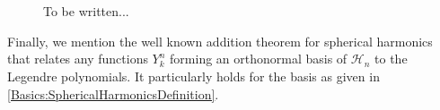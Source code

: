 \begin{figure}[htbp]
   \\
   \hfill
   \hfill
   \\
  \caption{To be written...}
  \label{Basics:Figure:SphericalHarmonics}
\end{figure}

Finally, we mention the well known addition theorem for spherical harmonics 
that relates any functions $Y_k^n$ forming an orthonormal basis of $\mathcal{H}_n$ 
to the Legendre polynomials. It particularly holds for the basis as given in 
\eqref{Basics:SphericalHarmonicsDefinition}.


